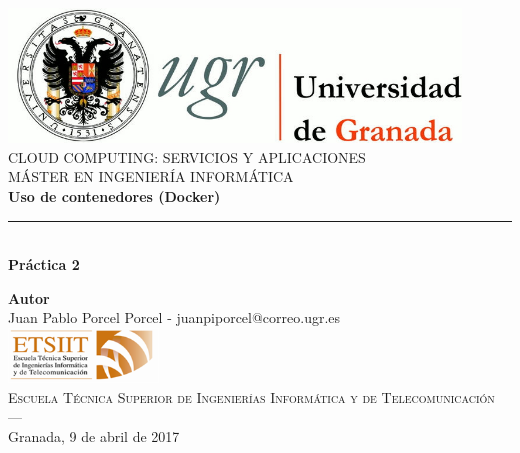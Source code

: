 \begin{titlepage}
 
 
\newlength{\centeroffset}
\setlength{\centeroffset}{-0.5\oddsidemargin}
\addtolength{\centeroffset}{0.5\evensidemargin}
\thispagestyle{empty}

\noindent\hspace*{\centeroffset}\begin{minipage}{\textwidth}

\centering
\includegraphics[width=0.9\textwidth]{images/logo_ugr.jpg}\\[1.4cm]

\textsc{ \Large CLOUD COMPUTING: SERVICIOS Y APLICACIONES\\[0.2cm]}
\textsc{ MÁSTER EN INGENIERÍA INFORMÁTICA }\\[1cm]
% 
{\Huge\bfseries Uso	de contenedores (Docker)}
\noindent\rule[-1ex]{\textwidth}{3pt}\\[3.5ex]
{\large\bfseries Práctica 2}
\end{minipage}

\vspace{4.5cm}
\noindent\hspace*{\centeroffset}\begin{minipage}{\textwidth}
\centering

\textbf{Autor}\\ {Juan Pablo Porcel Porcel - juanpiporcel@correo.ugr.es}\\[1cm]
\includegraphics[width=0.3\textwidth]{images/etsiit_logo.png}\\[0.1cm]
\textsc{Escuela Técnica Superior de Ingenierías Informática y de Telecomunicación}\\
\textsc{---}\\
Granada, 9 de abril de 2017
\end{minipage}
\end{titlepage}


